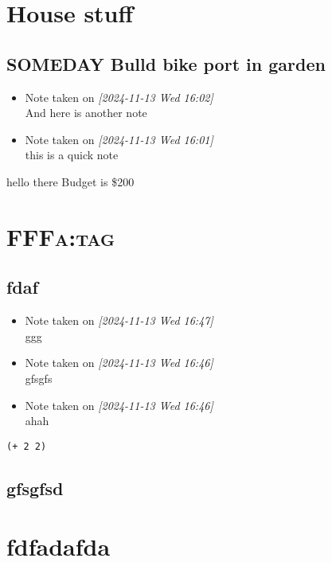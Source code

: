 \documentclass[11pt]{article}
\begin{document}
\section{House stuff}
\label{sec:org9cb757b}
\subsection{{\bfseries\sffamily SOMEDAY} Bulld bike port in garden}
\label{sec:orga02d3f6}
\begin{itemize}
\item Note taken on \textit{[2024-11-13 Wed 16:02] } \\[0pt]
And here is another note
\item Note taken on \textit{[2024-11-13 Wed 16:01] } \\[0pt]
this is a quick note
\end{itemize}

hello there
Budget is \$200


\section{FFF\hfill{}\textsc{a:tag}}
\label{sec:org5e57756}
\subsection{fdaf}
\label{sec:org7e54068}

\begin{itemize}
\item Note taken on \textit{[2024-11-13 Wed 16:47] } \\[0pt]
ggg
\item Note taken on \textit{[2024-11-13 Wed 16:46] } \\[0pt]
gfsgfs
\end{itemize}
\begin{itemize}
\item Note taken on \textit{[2024-11-13 Wed 16:46] } \\[0pt]
ahah
\end{itemize}
\begin{verbatim}
(+ 2 2)
\end{verbatim}
\subsection{gfsgfsd}
\label{sec:org7105c20}
\section{fdfadafda}
\label{sec:org2ae316f}
\end{document}
